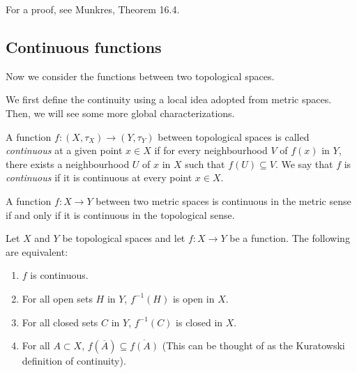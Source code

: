 For a proof, see Munkres, Theorem 16.4.

\subsection{Continuous functions}

Now we consider the functions between two topological spaces.

We first define the continuity using a local idea adopted from metric spaces. Then, we will see some more global characterizations.
\begin{definition}
  A function $f:(X,{\tau}_X)\to(Y,{\tau}_Y)$ between topological spaces is called \emph{continuous} at a given point $x\in X$ if for every neighbourhood $V$ of $f(x)$ in $Y$, there exists a neighbourhood $U$ of $x$ in $X$ such that $f(U)\subseteq V$. We say that $f$ is \emph{continuous} if it is continuous at every point $x\in X$.
\end{definition}







\begin{example}
  A function $f:X\to Y$ between two metric spaces is continuous in the metric sense if and only if it is continuous in the topological sense.
\end{example}

\begin{theorem}
  Let $X$ and $Y$ be topological spaces and let $f:X\to Y$ be a function. The following are equivalent:
  \begin{enumerate}
    \item $f$ is continuous.
    \item For all open sets $H$ in $Y$, $f^{-1}(H)$ is open in $X$.
    \item For all closed sets $C$ in $Y$, $f^{-1}(C)$ is closed in $X$.
    \item For all $A\subset X$, $f(\overline{A}) \subseteq \overline{f(A)}$ (This can be thought of as the Kuratowski definition of continuity).
  \end{enumerate}
\end{theorem}

